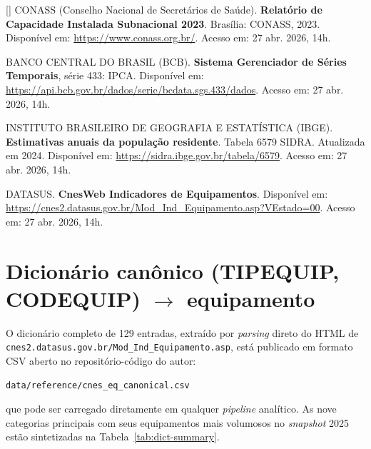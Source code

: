 \documentclass[12pt,a4paper,oneside]{article}
\begin{document}
\begin{singlespace}
\noindent\hangindent=1.25cm
[\thebibctr] CONASS (Conselho Nacional de Secretários de Saúde).
\textbf{Relatório de Capacidade Instalada Subnacional 2023}.
Brasília: CONASS, 2023. Disponível em:
\url{https://www.conass.org.br/}. Acesso em: 27 abr. 2026,
14h.\label{ref:conass-rel}\par\smallskip

\noindent\hangindent=1.25cm
BANCO CENTRAL DO BRASIL (BCB). \textbf{Sistema Gerenciador de
Séries Temporais}, série 433: IPCA. Disponível em:
\url{https://api.bcb.gov.br/dados/serie/bcdata.sgs.433/dados}.
Acesso em: 27 abr. 2026, 14h.\par\smallskip

\noindent\hangindent=1.25cm
INSTITUTO BRASILEIRO DE GEOGRAFIA E ESTATÍSTICA (IBGE).
\textbf{Estimativas anuais da população residente}. Tabela 6579
SIDRA. Atualizada em 2024. Disponível em:
\url{https://sidra.ibge.gov.br/tabela/6579}. Acesso em: 27 abr.
2026, 14h.\par\smallskip

\noindent\hangindent=1.25cm
DATASUS. \textbf{CnesWeb \textendash{} Indicadores de
Equipamentos}. Disponível em:
\url{https://cnes2.datasus.gov.br/Mod_Ind_Equipamento.asp?VEstado=00}.
Acesso em: 27 abr. 2026, 14h.\par\smallskip

\end{singlespace}


\appendix
\section{Dicionário canônico (TIPEQUIP, CODEQUIP) $\to$ equipamento}\label{sec:dict}

O dicionário completo de 129 entradas, extraído por \textit{parsing}
direto do HTML de
\texttt{cnes2.datasus.gov.br/Mod\_Ind\_Equipamento.asp}, está
publicado em formato CSV aberto no repositório-código do autor:

\begin{center}
\texttt{data/reference/cnes\_eq\_canonical.csv}
\end{center}

\noindent que pode ser carregado diretamente em qualquer
\textit{pipeline} analítico. As nove categorias principais com
seus equipamentos mais volumosos no \textit{snapshot} 2025 estão
sintetizadas na Tabela~\ref{tab:dict-summary}.
\end{document}

